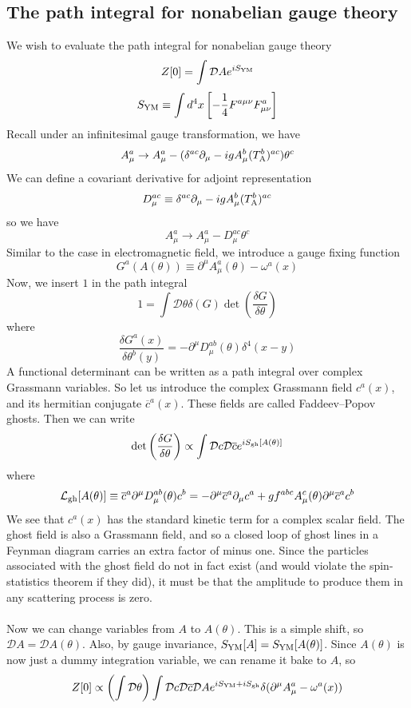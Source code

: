 \subsection{The path integral for nonabelian gauge theory}
We wish to evaluate the path integral for nonabelian gauge theory
\[Z[0] = \int \mathcal{D}A e^{iS_{\rm YM}}\]
\[S_{\rm YM} \equiv \int d^4x \left[-\frac{1}{4}F^{a\mu\nu}F^{a}_{\mu\nu} \right]\]
Recall under an infinitesimal gauge transformation, we have
\[A^{a}_{\mu} \to A^{a}_{\mu} -(\delta^{ac}\partial_{\mu}-igA^{b}_{\mu}(T_{\rm A}^{b})^{ac})\theta^c\]
We can define a covariant derivative for adjoint representation
\[D_{\mu}^{ac} \equiv \delta^{ac}\partial_{\mu}-igA^{b}_{\mu}(T_{\rm A}^{b})^{ac}\]
so we have
\[A^{a}_{\mu} \to A^{a}_{\mu} - D_{\mu}^{ac}\theta^c\]
Similar to the case in electromagnetic field, we introduce a gauge fixing function
\[G^a(A(\theta)) \equiv \partial^{\mu}A^a_{\mu}(\theta)  - \omega^a(x)\]
Now, we insert $1$ in the path integral
\[1 = \int \mathcal{D}\theta \delta(G) \det\left( \frac{\delta G}{\delta \theta} \right)\]
where
\[\frac{\delta G^a(x)}{\delta \theta^b(y)} = -\partial^{\mu}D_{\mu}^{ab}(\theta)\delta^4(x-y)\]
A functional determinant can be written as a path integral over complex Grassmann variables. So let us introduce the complex Grassmann field $c^a(x)$, and its hermitian conjugate $\overline{c}^a(x)$. These fields are called Faddeev–Popov ghosts. Then we can write
\[ \det\left( \frac{\delta G}{\delta \theta} \right) \propto \int \mathcal{D}c \mathcal{D}\overline{c} e^{iS_{\rm gh}[A(\theta)]}\]
where
\[\mathcal{L}_{\rm gh}[A(\theta)] \equiv \overline{c}^a \partial^{\mu}D^{ab}_{\mu}(\theta)c^b = -\partial^{\mu}\overline{c}^a \partial_{\mu}c^a + gf^{abc}A^c_{\mu}(\theta)\partial^{\mu}\overline{c}^a c^b\]
We see that $c^a(x)$ has the standard kinetic term for a complex scalar field.  The ghost field is also a Grassmann field, and so a closed loop of ghost lines in a Feynman diagram carries an extra factor of minus one. Since the particles associated with the ghost field do not in fact exist (and would violate the spin-statistics theorem if they did), it must be that the amplitude to produce them in any scattering process is zero.
\\ \\
Now we can change variables from $A$ to $A(\theta)$. This is a simple shift, so $\mathcal{D}A = \mathcal{D}A(\theta)$. Also, by gauge invariance, $S_{\rm YM}[A] = S_{\rm YM}[A(\theta)]$. Since $A(\theta)$ is now just a dummy integration variable, we can rename it bake to $A$, so
\[Z[0] \propto \left(\int \mathcal{D}\theta\right) \int \mathcal{D}c \mathcal{D}\overline{c} \mathcal{D}A e^{iS_{\rm YM} + iS_{\rm gh}} \delta(\partial^{\mu}A^a_{\mu}-\omega^a(x))\]
